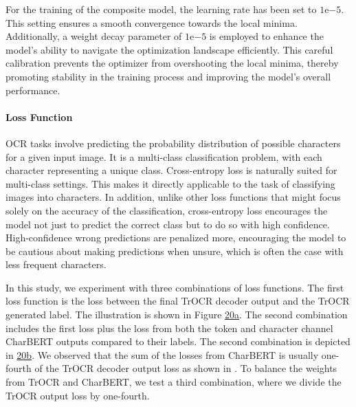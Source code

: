 For the training of the composite model, the learning rate has been set to $1\mathrm{e}{-5}$. This setting ensures a smooth convergence towards the local minima. Additionally, a weight decay parameter of $1\mathrm{e}{-5}$ is employed to enhance the model's ability to navigate the optimization landscape efficiently. This careful calibration prevents the optimizer from overshooting the local minima, thereby promoting stability in the training process and improving the model's overall performance.

\paragraph*{Loss Function}
\label{par:4_loss_function}
OCR tasks involve predicting the probability distribution of possible characters for a given input image. It is a multi-class classification problem, with each character representing a unique class. Cross-entropy loss is naturally suited for multi-class settings. This makes it directly applicable to the task of classifying images into characters. In addition, unlike other loss functions that might focus solely on the accuracy of the classification, cross-entropy loss encourages the model not just to predict the correct class but to do so with high confidence. High-confidence wrong predictions are penalized more, encouraging the model to be cautious about making predictions when unsure, which is often the case with less frequent characters.

In this study, we experiment with three combinations of loss functions. The first loss function is the loss between the final TrOCR decoder output and the TrOCR generated label. The illustration is shown in Figure \hyperref[fig:4_loss_1]{20a}. The second combination includes the first loss plus the loss from both the token and character channel CharBERT outputs compared to their labels. The second combination is depicted in \hyperref[fig:4_loss_2]{20b}. We observed that the sum of the losses from CharBERT is usually one-fourth of the TrOCR decoder output loss as shown in . To balance the weights from TrOCR and CharBERT, we test a third combination, where we divide the TrOCR output loss by one-fourth.



